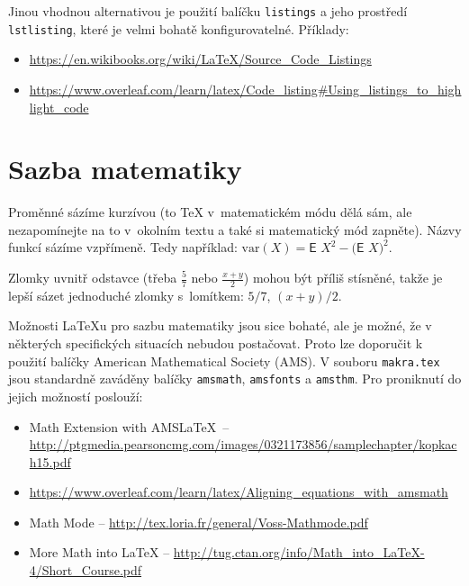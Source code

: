 Jinou vhodnou alternativou je použití balíčku \texttt{listings} a jeho prostředí \texttt{lstlisting}, které je velmi bohatě konfigurovatelné. Příklady:
\begin{itemize}
\item \url{https://en.wikibooks.org/wiki/LaTeX/Source_Code_Listings}
\item \url{https://www.overleaf.com/learn/latex/Code_listing#Using_listings_to_highlight_code}
\end{itemize}


\section{Sazba matematiky}
Proměnné sázíme kurzívou (to \TeX{} v~matematickém módu dělá sám, ale
nezapomínejte na to v~okolním textu a také si matematický mód zapněte).
Názvy funkcí sázíme vzpřímeně. Tedy například:
$\textrm{var} (X) = \textsf{E~} X^2 - \bigl(\textsf{E~} X \bigr)^2$.

Zlomky uvnitř odstavce (třeba $\frac{5}{7}$ nebo $\frac{x+y}{2}$) mohou
být příliš stísněné, takže je lepší sázet jednoduché zlomky s~lomítkem:
$5/7$, $(x+y)/2$.

Možnosti \LaTeX u pro sazbu matematiky jsou sice bohaté, ale je možné, že v některých specifických situacích nebudou postačovat. Proto lze doporučit k použití balíčky American Mathematical Society (AMS). V souboru \texttt{makra.tex} jsou standardně zaváděny balíčky \texttt{amsmath}, \texttt{amsfonts} a \texttt{amsthm}. Pro proniknutí do jejich možností poslouží:
\begin{itemize}
\item Math Extension with AMS\LaTeX\ -- \url{http://ptgmedia.pearsoncmg.com/images/0321173856/samplechapter/kopkach15.pdf}
\item \url{https://www.overleaf.com/learn/latex/Aligning_equations_with_amsmath}
\item Math Mode -- \url{http://tex.loria.fr/general/Voss-Mathmode.pdf}
\item More Math into LaTeX -- \url{http://tug.ctan.org/info/Math_into_LaTeX-4/Short_Course.pdf}
\end{itemize}
